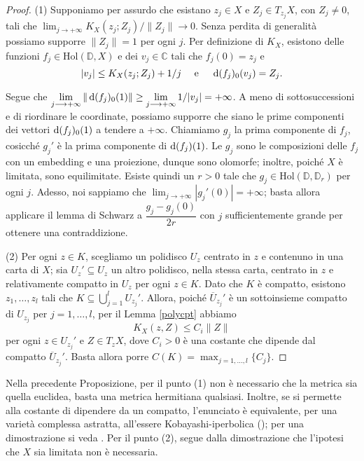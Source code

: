 \begin{proof}
    (1) Supponiamo per assurdo che esistano $z_j \in X$ e $Z_j \in T_{z_j}X$, con $Z_j\not=0$, tali che $\displaystyle \lim_{j \longrightarrow +\infty} K_X(z_j;Z_j)/\|Z_j\| \longrightarrow 0$. Senza perdita di generalità possiamo supporre $\|Z_j\|=1$ per ogni $j$. Per definizione di $K_X$, esistono delle funzioni $f_j\in\text{Hol}(\mathbb{D},X)$ e dei $v_j \in \mathbb{C}$ tali che $f_j(0)=z_j$ e
    $$|v_j| \le K_X(z_j;Z_j)+1/j\quad\text{ e }\quad \mathop{}\!\mathrm{d} (f_j)_0(v_j)=Z_j.$$

    Segue che $\displaystyle \lim_{j \longrightarrow +\infty}\|\mathop{}\!\mathrm{d}(f_j)_0(1)\| \ge \lim_{j \longrightarrow +\infty}1/|v_j|=+\infty$. A meno di sottosuccessioni e di riordinare le coordinate, possiamo supporre che siano le prime componenti dei vettori $\mathop{}\!\mathrm{d}(f_j)_0(1)$ a tendere a $+\infty$. Chiamiamo $g_j$ la prima componente di $f_j$, cosicché $g_j'$ è la prima componente di $\mathop{}\!\mathrm{d}(f_j)(1)$. Le $g_j$ sono le composizioni delle $f_j$ con un embedding e una proiezione, dunque sono olomorfe; inoltre, poiché $X$ è limitata, sono equilimitate. Esiste quindi un $r>0$ tale che $g_j \in \text{Hol}(\mathbb{D},\mathbb{D}_r)$ per ogni $j$. Adesso, noi sappiamo che $\displaystyle\lim_{j\longrightarrow +\infty} |g_j'(0)|=+\infty$; basta allora applicare il lemma di Schwarz a $\dfrac{g_j-g_j(0)}{2r}$ con $j$ sufficientemente grande per ottenere una contraddizione.

    (2) Per ogni $z \in K$, scegliamo un polidisco $U_z$ centrato in $z$ e contenuno in una carta di $X$; sia $U_z'\subseteq U_z$ un altro polidisco, nella stessa carta, centrato in $z$ e relativamente compatto in $U_z$ per ogni $z \in K$. Dato che $K$ è compatto, esistono $z_1,\dots,z_l$ tali che $K\subseteq\displaystyle\bigcup_{j=1}^l U_{z_j}'$. Allora, poiché $\overline{U}_{z_j}'$ è un sottoinsieme compatto di $U_{z_j}$ per $j=1,\dots,l$, per il Lemma \ref{polycpt} abbiamo
    $$K_X(z,Z) \le C_i\|Z\|$$
    per ogni $z \in U_{z_j}'$ e $Z\in T_zX$, dove $C_i>0$ è una costante che dipende dal compatto $\overline{U}_{z_j}'$. Basta allora porre $C(K)=\displaystyle\max_{j=1,\dots,l}\{C_j\}$.
\end{proof}

\begin{oss} \label{basta_herm}
    Nella precedente Proposizione, per il punto (1) non è necessario che la metrica sia quella euclidea, basta una metrica hermitiana qualsiasi. Inoltre, se si permette alla costante di dipendere da un compatto, l'enunciato è equivalente, per una varietà complessa astratta, all'essere Kobayashi-iperbolica (\cite[Theorem 2]{Roy}); per una dimostrazione si veda \cite[Proposition 2.3.33]{A1}. Per il punto (2), segue dalla dimostrazione che l'ipotesi che $X$ sia limitata non è necessaria.
\end{oss}


